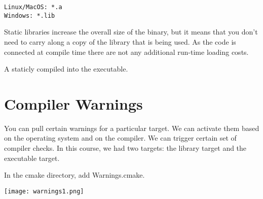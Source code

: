 \begin{verbatim}
Linux/MacOS: *.a
Windows: *.lib
\end{verbatim}

Static libraries increase the overall size of the binary, but it means that you don't need to carry along a copy of the library that is being used.
As the code is connected at compile time there are not any additional run-time loading costs.

A staticly compiled into the executable.


\section{Compiler Warnings}

You can pull certain warnings for a particular target.
We can activate them based on the operating system and on the compiler.
We can trigger certain set of compiler checks.
In this course, we had two targets: the library target and the executable target.

In the cmake directory, add Warnings.cmake. 

\begin{center}
    \texttt{[image: warnings1.png]}
\end{center}

